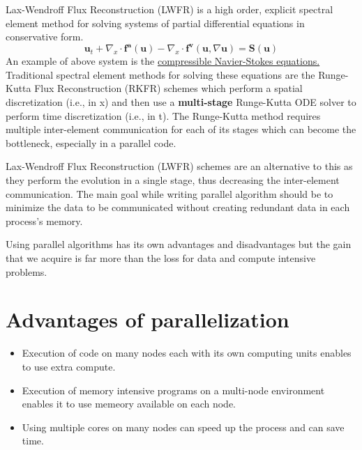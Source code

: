 Lax-Wendroff Flux Reconstruction (LWFR) is a high order, explicit spectral element method for solving systems of partial differential equations in conservative form. 
\begin{equation}
    \boldsymbol{u}_t + \nabla_x \cdot \boldsymbol{f^a(u)} - \nabla_x \cdot \boldsymbol{f^v}(\boldsymbol{u},\nabla \boldsymbol{u}) = \boldsymbol{S(u)}
\end{equation}
An example of above system is the \href{https://en.wikipedia.org/wiki/Navier%E2%80%93Stokes_equations}{compressible Navier-Stokes equations.} Traditional spectral element methods for solving these equations are the Runge-Kutta Flux Reconstruction (RKFR) schemes which perform a spatial discretization (i.e., in x) and then use a \textbf{multi-stage} Runge-Kutta ODE solver to perform time discretization (i.e., in t). The Runge-Kutta method requires multiple inter-element communication for each of its stages which can become the bottleneck, especially in a parallel code.  

Lax-Wendroff Flux Reconstruction (LWFR) schemes are an alternative to this as they perform the evolution in a single stage, thus decreasing the inter-element communication. The main goal while writing parallel algorithm should be to minimize the data to be communicated without creating redundant data in each process's memory. 

Using parallel algorithms has its own advantages and disadvantages but the gain that we acquire is far more than the loss for data and compute intensive problems.
\section{Advantages of parallelization}
\begin{itemize}
    \item Execution of code on many nodes each with its own computing units enables to use extra compute.
    \item Execution of memory intensive programs on a multi-node environment enables it to use memeory available on each node.
    \item Using multiple cores on many nodes can speed up the process and can save time.
\end{itemize}

